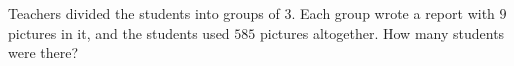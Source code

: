 Teachers divided the students into groups of $3$. Each group wrote a report with $9$ pictures in it, and the students used $585$ pictures altogether. How many students were there?
